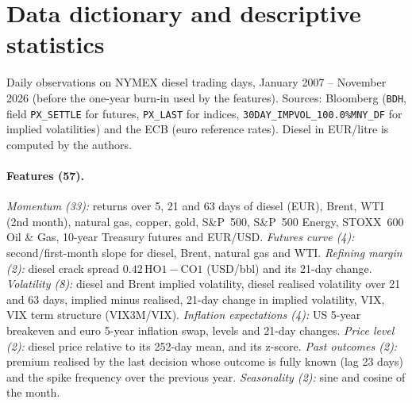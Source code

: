 \section{Data dictionary and descriptive statistics}\label{app:data}

Daily observations on NYMEX diesel trading days, January 2007 -- November 2026 (before the one-year
burn-in used by the features). Sources: Bloomberg (\texttt{BDH}, field \texttt{PX\_SETTLE} for futures,
\texttt{PX\_LAST} for indices, \texttt{30DAY\_IMPVOL\_100.0\%MNY\_DF} for implied volatilities) and the ECB
(euro reference rates). Diesel in EUR/litre is computed by the authors.

\begin{table}[H]
\centering\scriptsize
{}
\caption{Raw series used by the product (21, before feature engineering) and the derived diesel price.}
\end{table}

\paragraph{Features (57).} \emph{Momentum (33):} returns over 5, 21 and 63 days of diesel (EUR), Brent,
WTI (2nd month), natural gas, copper, gold, S\&P~500, S\&P~500 Energy, STOXX~600 Oil \& Gas, 10-year
Treasury futures and EUR/USD. \emph{Futures curve (4):} second/first-month slope for diesel, Brent, natural
gas and WTI. \emph{Refining margin (2):} diesel crack spread $0.42\,\mathrm{HO1}-\mathrm{CO1}$ (USD/bbl) and
its 21-day change. \emph{Volatility (8):} diesel and Brent implied volatility, diesel realised volatility
over 21 and 63 days, implied minus realised, 21-day change in implied volatility, VIX, VIX term structure
(VIX3M/VIX). \emph{Inflation expectations (4):} US 5-year breakeven and euro 5-year inflation swap, levels and
21-day changes. \emph{Price level (2):} diesel price relative to its 252-day mean, and its z-score.
\emph{Past outcomes (2):} premium realised by the last decision whose outcome is fully known (lag 23 days)
and the spike frequency over the previous year. \emph{Seasonality (2):} sine and cosine of the month.
